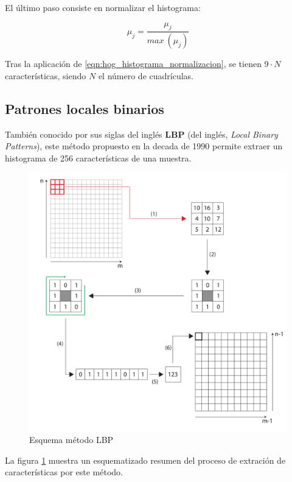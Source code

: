 El último paso consiste en normalizar el histograma:

\begin{equation}
	\label{eqn:hog_histograma_normalizacion}
	\mu_{j} = \dfrac{\mu_{j}}{max\:(\mu_{j})}
\end{equation}

Tras la aplicación de \ref{eqn:hog_histograma_normalizacion}, se tienen $ 9\cdot N$ características, siendo $ N $ el número de cuadrículas.

\pagebreak
\subsection{Patrones locales binarios}

También conocido por sus siglas del inglés \textbf{LBP} (del inglés, \textit{Local Binary Patterns}), este método propuesto en la decada de 1990 \cite{572934} permite extraer un histograma de 256 características de una muestra.

\begin{figure}[H]
	\centering
	\captionsetup{justification=centering}
	\includegraphics[width=\textwidth]{imagenes/marco_teorico/LBP/LBP_diagrama.pdf}
	\caption{Esquema método LBP}	
	\label{fig:LBP_diagrama}
\end{figure}

La figura \ref{fig:LBP_diagrama} muestra un esquematizado resumen del proceso de extración de características por este método.

